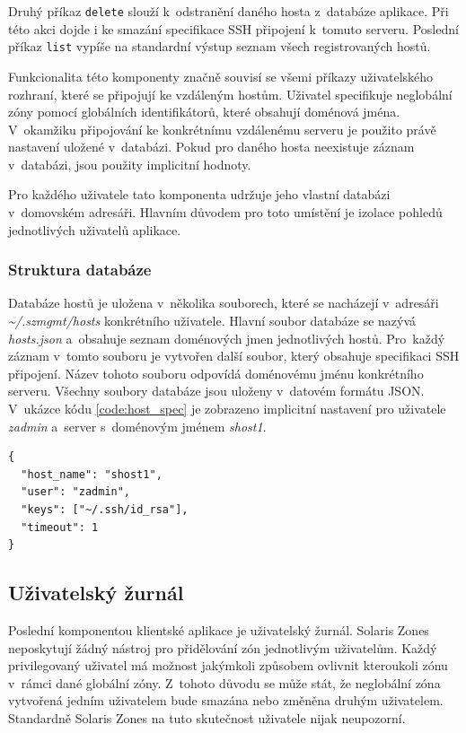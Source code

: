 Druhý příkaz \verb|delete| slouží k~odstranění daného hosta z~databáze aplikace. Při této akci dojde i ke smazání specifikace
SSH připojení k~tomuto serveru. Poslední příkaz \verb|list| vypíše na standardní výstup seznam všech registrovaných hostů.

Funkcionalita této komponenty značně souvisí se všemi příkazy uživatelského rozhraní, které se připojují ke vzdáleným hostům.
Uživatel specifikuje neglobální zóny pomocí globálních identifikátorů, které obsahují doménová jména. V~okamžiku připojování
ke konkrétnímu vzdálenému serveru je použito právě nastavení uložené v~databázi. Pokud pro daného hosta neexistuje záznam
v~databázi, jsou použity implicitní hodnoty.

Pro každého uživatele tato komponenta udržuje jeho vlastní databázi v~domovském adresáři. Hlavním důvodem pro toto umístění
je izolace pohledů jednotlivých uživatelů aplikace.
\subsubsection{Struktura databáze}
\label{chapter:implementation:client:hosts:database}
Databáze hostů je uložena v~několika souborech, které se nacházejí v~adresáři \textit{\textasciitilde/.szmgmt/hosts} konkrétního uživatele.
Hlavní soubor databáze se nazývá \textit{hosts.json} a~obsahuje seznam doménových jmen jednotlivých hostů. Pro~každý záznam 
v~tomto souboru je vytvořen další soubor, který obsahuje specifikaci SSH připojení. Název tohoto souboru odpovídá doménovému
jménu konkrétního serveru. Všechny soubory databáze jsou uloženy v~datovém formátu JSON. V~ukázce kódu \ref{code:host_spec}
je zobrazeno implicitní nastavení pro uživatele \textit{zadmin} a~server s~doménovým jménem \textit{shost1}.
\begin{listing}[ht]
  \caption{Implicitní nastavení parametrů SSH připojení}
  \begin{verbatim} 
{
  "host_name": "shost1",
  "user": "zadmin",
  "keys": ["~/.ssh/id_rsa"],
  "timeout": 1
}
  \end{verbatim}
  \label{code:host_spec}
\end{listing}
\subsection{Uživatelský žurnál}
\label{chapter:implementation:client:journal}
Poslední komponentou klientské aplikace je uživatelský žurnál. Solaris Zones neposkytují žádný nástroj pro přidělování zón 
jednotlivým uživatelům. Každý privilegovaný uživatel má možnost jakýmkoli způsobem ovlivnit kteroukoli zónu v~rámci dané globální
zóny. Z~tohoto důvodu se může stát, že neglobální zóna vytvořená jedním uživatelem bude smazána nebo změněna druhým uživatelem.
Standardně Solaris Zones na tuto skutečnost uživatele nijak neupozorní. 

